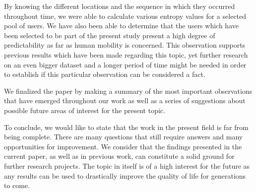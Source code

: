By knowing the different locations and the sequence in which they occurred
throughout time, we were able to calculate various entropy values for a selected
pool of users. We have also been able to determine that the users which have
been selected to be part of the present study present a high degree of
predictability as far as human mobility is concerned. This observation supports
previous results which have been made regarding this topic, yet further research
on an even bigger dataset and a longer period of time might be needed in order
to establish if this particular observation can be considered a fact.

We finalized the paper by making a summary of the most important
observations that have emerged throughout our work as well as a series of
suggestions about possible future areas of interest for the present topic.

To conclude, we would like to state that the work in the present field is far
from being complete. There are many questions that still require answers and
many opportunities for improvement. We consider that the findings presented in
the current paper, as well as in previous work, can constitute a solid ground
for further research projects. The topic in itself is of a high interest for the
future as any results can be used to drastically improve the quality of life for
generations to come.